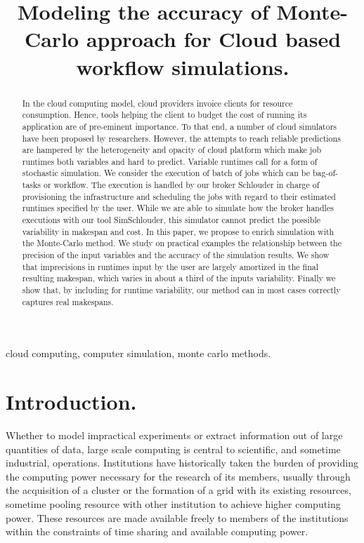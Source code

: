 \documentclass[10pt,conference,compsocconf]{IEEEtran}
\title{Modeling the accuracy of Monte-Carlo approach for Cloud based workflow simulations.}
\author{\IEEEauthorblockN{Luke~Bertot 
			and Stéphane~Genaud 
			and Julien~Gossa}
	\IEEEauthorblockA{Icube-ICPS --- UMR 7357, Univeristé de Strasbourg, CNRS\\
		P\^ole API Blvd S. Bant, 67400 Illkirch\\
		email: \url{lbertot@unistra.fr}, \url{genaud@unistra.fr}, \url{gossa@unistra.fr}}
	}
\begin{document}
\maketitle

\begin{abstract}
  In the  cloud computing  model, cloud providers  invoice clients  for resource
  consumption. Hence, tools helping the client to budget the cost of running its
  application are  of pre-eminent  importance. To  that end,  a number  of cloud
  simulators have been  proposed by researchers. However, the  attempts to reach
  reliable predictions  are hampered by  the heterogeneity and opacity  of cloud
  platform which make job runtimes both  variables and hard to predict. Variable
  runtimes call for a form of stochastic simulation.  
%
  We  consider the  execution of  batch  of jobs  which can  be bag-of-tasks  or
  workflow.   The execution  is handled  by our  broker Schlouder  in charge  of
  provisioning the infrastructure and scheduling  the jobs with regard to their
  estimated runtimes specified  by the user.  While we are  able to simulate how
  the  broker handles  executions  with our  tool  SimSchlouder, this  simulator
  cannot predict the possible variability in  makespan and cost.  In this paper,
  we propose  to enrich  simulation with  the Monte-Carlo  method.  We  study on
  practical  examples  the  relationship  between the  precision  of  the  input
  variables  and  the  accuracy  of   the  simulation  results.   We  show  that
  imprecisions in runtimes input by the  user are largely amortized in the final
  resulting makespan, which  varies in about a third of  the inputs variability.
  Finally we show that, by including for runtime variability, our method can in
  most cases correctly captures real makespans. 
\end{abstract}

\begin{IEEEkeywords}
cloud computing, computer simulation, monte carlo methods.
\end{IEEEkeywords}

\section{Introduction.}

Whether to  model impractical  experiments or extract  information out  of large
quantities of data, large scale computing is central to scientific, and sometime
industrial,  operations.  Institutions  have  historically taken  the burden  of
providing the computing power necessary for the research of its members, usually
through  the acquisition  of a  cluster  or the  formation  of a  grid with  its
existing resources, sometime pooling resource  with other institution to achieve
higher computing power.  These resources are made available freely to members of
the institutions within the constraints  of time sharing and available computing
power.
\end{document}
